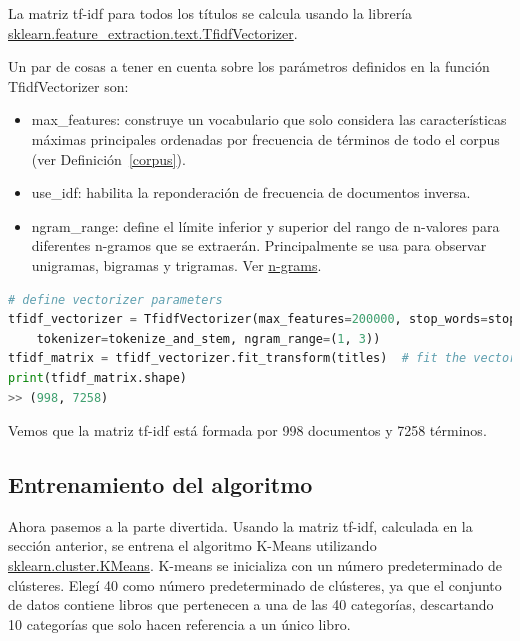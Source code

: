 \documentclass{uimppracticas}
\begin{document}
La matriz tf-idf para todos los títulos se calcula usando la librería \href{https://scikit-learn.org/stable/modules/generated/sklearn.feature_extraction.text.TfidfVectorizer.html}{sklearn.feature\_extraction.text.TfidfVectorizer}. 

Un par de cosas a tener en cuenta sobre los parámetros definidos en la función TfidfVectorizer son:

\begin{itemize}
	\item max\_features: construye un vocabulario que solo considera las características máximas principales ordenadas por frecuencia de términos de todo el corpus (ver Definición~\ref{corpus}).
	\item use\_idf: habilita la reponderación de frecuencia de documentos inversa.
	\item ngram\_range: define el límite inferior y superior del rango de n-valores para diferentes n-gramos que se extraerán. Principalmente se usa para observar unigramas, bigramas y trigramas. Ver \href{https://en.wikipedia.org/wiki/N-gram}{n-grams}.
\end{itemize}

\begin{lstlisting}[language=python]
# define vectorizer parameters
tfidf_vectorizer = TfidfVectorizer(max_features=200000, stop_words=stopwords, use_idf=True,
	tokenizer=tokenize_and_stem, ngram_range=(1, 3))
tfidf_matrix = tfidf_vectorizer.fit_transform(titles)  # fit the vectorizer to titles
print(tfidf_matrix.shape)
>> (998, 7258)
\end{lstlisting}

Vemos que la matriz tf-idf está formada por 998 documentos y 7258 términos.

\subsection{Entrenamiento del algoritmo}

Ahora pasemos a la parte divertida. Usando la matriz tf-idf, calculada en la sección anterior, se entrena el algoritmo K-Means utilizando \href{https://scikit-learn.org/stable/modules/generated/sklearn.cluster.KMeans.html}{sklearn.cluster.KMeans}. K-means se inicializa con un número predeterminado de clústeres. Elegí 40 como número predeterminado de clústeres, ya que el conjunto de datos contiene libros que pertenecen a una de las 40 categorías, descartando 10 categorías que solo hacen referencia a un único libro.
\end{document}
